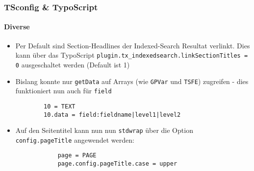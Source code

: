 \begin{frame}[fragile]
	\frametitle{TSconfig \& TypoScript}
	\framesubtitle{Diverse}

	\begin{itemize}
		\item Per Default sind Section-Headlines der Indexed-Search Resultat verlinkt. Dies kann über das TypoScript \texttt{plugin.tx\_indexedsearch.linkSectionTitles = 0} ausgeschaltet werden (Default ist 1) 

		\item Bislang konnte nur \texttt{getData} auf Arrays (wie \texttt{GPVar} und \texttt{TSFE}) zugreifen - dies funktioniert nun auch für \texttt{field}
		\begin{lstlisting}
		10 = TEXT
		10.data = field:fieldname|level1|level2
		\end{lstlisting}

		\item Auf den Seitentitel kann nun nun \texttt{stdwrap} über die Option \texttt{config.pageTitle} angewendet werden:
		\begin{lstlisting}
			page = PAGE
			page.config.pageTitle.case = upper
		\end{lstlisting}
	\end{itemize}

\end{frame}






